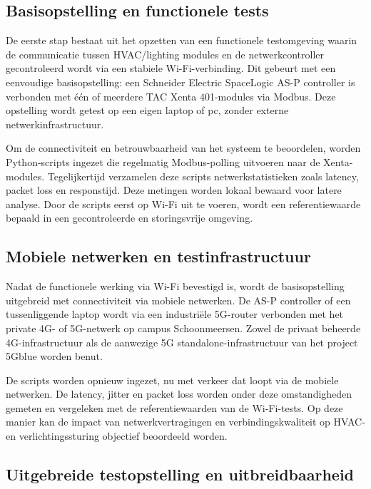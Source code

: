 \subsection{Basisopstelling en functionele tests}

De eerste stap bestaat uit het opzetten van een functionele testomgeving waarin de communicatie tussen HVAC/lighting modules en de netwerkcontroller gecontroleerd wordt via een stabiele Wi-Fi-verbinding. Dit gebeurt met een eenvoudige basisopstelling: een Schneider Electric SpaceLogic AS-P controller is verbonden met één of meerdere TAC Xenta 401-modules via Modbus. Deze opstelling wordt getest op een eigen laptop of pc, zonder externe netwerkinfrastructuur.

Om de connectiviteit en betrouwbaarheid van het systeem te beoordelen, worden Python-scripts ingezet die regelmatig Modbus-polling uitvoeren naar de Xenta-modules. Tegelijkertijd verzamelen deze scripts netwerkstatistieken zoals latency, packet loss en responstijd. Deze metingen worden lokaal bewaard voor latere analyse. Door de scripts eerst op Wi-Fi uit te voeren, wordt een referentiewaarde bepaald in een gecontroleerde en storingsvrije omgeving.

\subsection{Mobiele netwerken en testinfrastructuur}

Nadat de functionele werking via Wi-Fi bevestigd is, wordt de basisopstelling uitgebreid met connectiviteit via mobiele netwerken. De AS-P controller of een tussenliggende laptop wordt via een industriële 5G-router verbonden met het private 4G- of 5G-netwerk op campus Schoonmeersen. Zowel de privaat beheerde 4G-infrastructuur als de aanwezige 5G standalone-infrastructuur van het project 5Gblue worden benut.

De scripts worden opnieuw ingezet, nu met verkeer dat loopt via de mobiele netwerken. De latency, jitter en packet loss worden onder deze omstandigheden gemeten en vergeleken met de referentiewaarden van de Wi-Fi-tests. Op deze manier kan de impact van netwerkvertragingen en verbindingskwaliteit op HVAC- en verlichtingssturing objectief beoordeeld worden.

\subsection{Uitgebreide testopstelling en uitbreidbaarheid}

